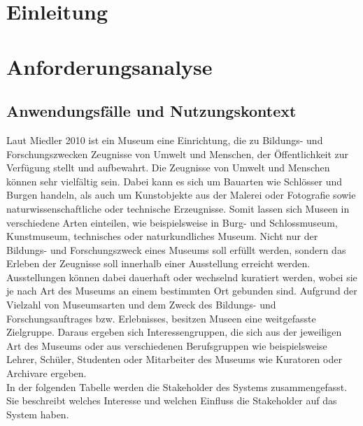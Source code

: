 \documentclass[runningheads,a4paper]{llncs}
\newcommand{\keywords}[1]{\par\addvspace\baselineskip
\noindent\keywordname\enspace\ignorespaces#1}
\begin{document}
\begin{abstract}
	

\keywords{}
\end{abstract}

\section{Einleitung}
\section{Anforderungsanalyse}
\subsection{Anwendungsfälle und Nutzungskontext} \label{sect:anwendung}
Laut Miedler 2010 ist ein Museum eine Einrichtung, die zu Bildungs- und Forschungszwecken Zeugnisse von Umwelt und Menschen, der Öffentlichkeit zur Verfügung stellt und aufbewahrt. Die Zeugnisse von Umwelt und Menschen können sehr vielfältig sein. Dabei kann es sich um Bauarten wie Schlösser und Burgen handeln, als auch um Kunstobjekte aus der Malerei oder Fotografie sowie naturwissenschaftliche oder technische Erzeugnisse. Somit lassen sich Museen in verschiedene Arten einteilen, wie beispielsweise in Burg- und Schlossmuseum, Kunstmuseum, technisches oder naturkundliches Museum. Nicht nur der Bildungs- und Forschungszweck eines Museums soll erfüllt werden, sondern das Erleben der Zeugnisse soll innerhalb einer Ausstellung erreicht werden. Ausstellungen können dabei dauerhaft oder wechselnd kuratiert werden, wobei sie je nach Art des Museums an einem bestimmten Ort gebunden sind. Aufgrund der Vielzahl von Museumsarten und dem Zweck des Bildungs- und Forschungsauftrages bzw. Erlebnisses, besitzen Museen eine weitgefasste Zielgruppe. Daraus ergeben sich Interessengruppen, die sich aus der jeweiligen Art des Museums oder aus verschiedenen Berufsgruppen wie beispielsweise Lehrer, Schüler, Studenten oder Mitarbeiter des Museums wie Kuratoren oder Archivare  ergeben\cite[S. 29]{Miedler.2010}.\\ 

In der folgenden Tabelle werden die Stakeholder des Systems zusammengefasst. Sie beschreibt welches Interesse und welchen Einfluss die Stakeholder auf das System haben.\\
\end{document}
